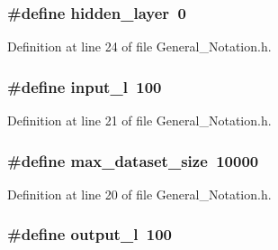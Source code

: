 \hypertarget{a00008_afecc3978fc788de7ecca333d28d62a08}{
\subsubsection[{hidden\-\_\-layer}]{\setlength{\rightskip}{0pt plus 5cm}\#define hidden\-\_\-layer~0}}\label{d4/dee/a00008_afecc3978fc788de7ecca333d28d62a08}


Definition at line 24 of file General\-\_\-\-Notation.\-h.

\hypertarget{a00008_a8dae3b2c955083e02ba56da92adbf25d}{
\subsubsection[{input\-\_\-l}]{\setlength{\rightskip}{0pt plus 5cm}\#define input\-\_\-l~100}}\label{d4/dee/a00008_a8dae3b2c955083e02ba56da92adbf25d}


Definition at line 21 of file General\-\_\-\-Notation.\-h.

\hypertarget{a00008_a137d3378ba32ae138541e30156fb5c66}{
\subsubsection[{max\-\_\-dataset\-\_\-size}]{\setlength{\rightskip}{0pt plus 5cm}\#define max\-\_\-dataset\-\_\-size~10000}}\label{d4/dee/a00008_a137d3378ba32ae138541e30156fb5c66}


Definition at line 20 of file General\-\_\-\-Notation.\-h.

\hypertarget{a00008_a0a0ddfc9fb3bc3d90d175ed1f7bd54c5}{
\subsubsection[{output\-\_\-l}]{\setlength{\rightskip}{0pt plus 5cm}\#define output\-\_\-l~100}}\label{d4/dee/a00008_a0a0ddfc9fb3bc3d90d175ed1f7bd54c5}


